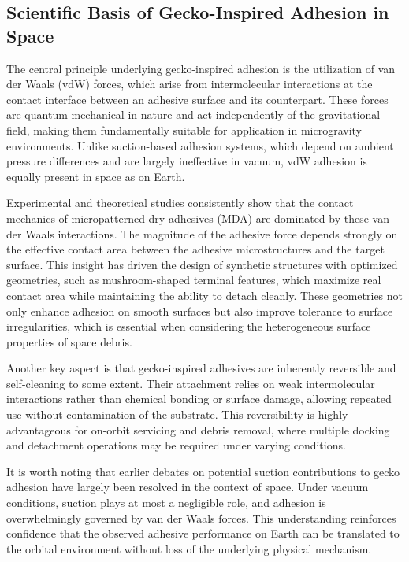 \documentclass[
    twocolumn,
    fontsize = 10pt,
    parskip = half+,
    headings = small,
    headwidth = text,
    footwidth = text,
]{scrartcl}
\begin{document}
\subsection{Scientific Basis of Gecko-Inspired Adhesion in Space}

The central principle underlying gecko-inspired adhesion is the utilization of van der Waals (vdW) forces, 
which arise from intermolecular interactions at the contact interface between an adhesive surface and its counterpart. 
These forces are quantum-mechanical in nature and act independently of the gravitational field, 
making them fundamentally suitable for application in microgravity environments. 
Unlike suction-based adhesion systems, which depend on ambient pressure differences and are largely ineffective in vacuum, 
vdW adhesion is equally present in space as on Earth.  

Experimental and theoretical studies consistently show that the contact mechanics of micropatterned dry adhesives (MDA) 
are dominated by these van der Waals interactions. 
The magnitude of the adhesive force depends strongly on the effective contact area between the adhesive microstructures 
and the target surface. 
This insight has driven the design of synthetic structures with optimized geometries, 
such as mushroom-shaped terminal features, which maximize real contact area while maintaining the ability to detach cleanly.  
These geometries not only enhance adhesion on smooth surfaces but also improve tolerance to surface irregularities, 
which is essential when considering the heterogeneous surface properties of space debris.  

Another key aspect is that gecko-inspired adhesives are inherently reversible and self-cleaning to some extent. 
Their attachment relies on weak intermolecular interactions rather than chemical bonding or surface damage, 
allowing repeated use without contamination of the substrate. 
This reversibility is highly advantageous for on-orbit servicing and debris removal, 
where multiple docking and detachment operations may be required under varying conditions.  

It is worth noting that earlier debates on potential suction contributions to gecko adhesion have largely been resolved in the context of space. 
Under vacuum conditions, suction plays at most a negligible role, 
and adhesion is overwhelmingly governed by van der Waals forces. 
This understanding reinforces confidence that the observed adhesive performance on Earth can be translated to the orbital environment 
without loss of the underlying physical mechanism.  
\end{document}
